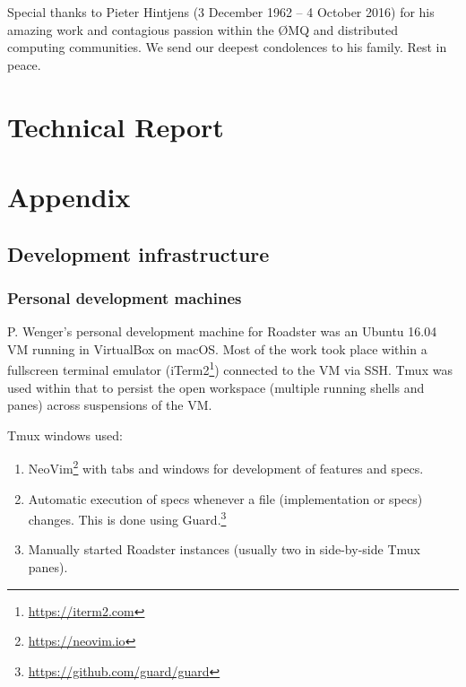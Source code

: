 \documentclass[a4paper]{report}
\newcommand\zmq{{\O}MQ\xspace}
\begin{document}
Special thanks to Pieter Hintjens {\textdagger} (3 December 1962 -- 4 October
2016) for his amazing work and contagious passion within the \zmq and
distributed computing communities. We send our deepest condolences to his
family. Rest in peace.


\setcounter{tocdepth}{3}
\tableofcontents
\listoffigures
\listoftables
\listoflistings

\pagebreak
{}
\setcounter{page}{1}
\setcounter{secnumdepth}{3}



\part{Technical Report}







\printbibliography
\printglossaries

\appendix
\part{Appendix}

\chapter{Development infrastructure}
\section{Personal development machines}
P. Wenger's personal development machine for Roadster was an Ubuntu 16.04 VM
running in VirtualBox on macOS. Most of the work took place within a fullscreen terminal
emulator (iTerm2\footnote{\url{https://iterm2.com}}) connected to the VM via SSH. Tmux was used within that to
persist the open workspace (multiple running shells and panes) across
suspensions of the VM.

Tmux windows used:
\begin{enumerate}
	\item NeoVim\footnote{\url{https://neovim.io}} with tabs and windows for development of features and specs.
	\item Automatic execution of specs whenever a file (implementation or
		specs) changes. This is done using
		Guard.\footnote{\url{https://github.com/guard/guard}}
	\item Manually started Roadster instances (usually two in side-by-side Tmux panes).
\end{enumerate}
\end{document}
